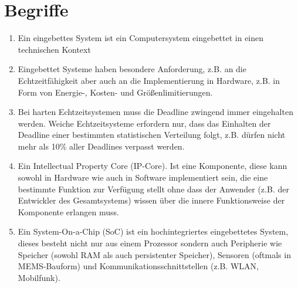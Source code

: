 \documentclass[DIN, pagenumber=false, fontsize=11pt, parskip=half]{scrartcl}
\begin{document}
    \section{Begriffe}
    \begin{enumerate}[label=\alph*)]
        \item Ein eingebettes System ist ein Computersystem eingebettet in einen 
            technischen Kontext
        \item Eingebettet Systeme haben besondere Anforderung, z.B. an die 
            Echtzeitfähigkeit aber auch an die Implementierung in Hardware,
            z.B. in Form von Energie-, Kosten- und Größenlimitierungen.
        \item Bei harten Echtzeitsystemen muss die Deadline zwingend immer eingehalten
            werden. Weiche Echtzeitsysteme erfordern nur, dass das Einhalten der
            Deadline einer bestimmten statistischen Verteilung folgt, z.B. dürfen
            nicht mehr als 10\% aller Deadlines verpasst werden.
        \item Ein \glqq{}Intellectual Property Core\grqq{} (IP-Core). Ist eine Komponente,
            diese kann sowohl in Hardware wie auch in Software implementiert sein,
            die eine bestimmte Funktion zur Verfügung stellt ohne dass der Anwender
            (z.B. der Entwickler des Gesamtsystems) wissen über die innere Funktionsweise
            der Komponente erlangen muss.
        \item Ein System-On-a-Chip (SoC) ist ein hochintegriertes eingebettetes System,
            dieses besteht nicht nur aus einem Prozessor sondern auch Peripherie wie
            Speicher (sowohl RAM als auch persistenter Speicher), Sensoren (oftmals in 
            MEMS-Bauform) und Kommunikationsschnittstellen (z.B. WLAN, Mobilfunk).
    \end{enumerate}
\end{document}
